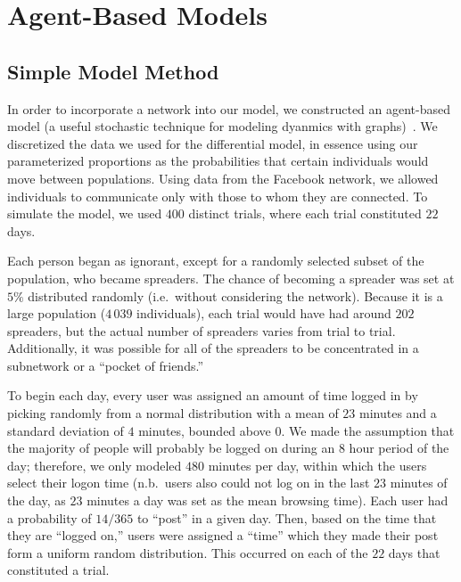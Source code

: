 \section{Agent-Based Models}
\label{sec:abmodel}

\subsection{Simple Model Method}
\label{subsec:abmodelsetup}

\noindent In order to incorporate a network into our model, we constructed an agent-based model (a useful stochastic technique for modeling dyanmics with graphs)~\cite{snijders-2010}.
We discretized the data we used for the differential model, in essence using our parameterized proportions as the probabilities that certain individuals would move between populations.
Using data from the Facebook network, we allowed individuals to communicate only with those to whom they are connected.
To simulate the model, we used $ 400 $ distinct trials, where each trial constituted $ 22 $ days.

Each person began as ignorant, except for a randomly selected subset of the population, who became spreaders.
The chance of becoming a spreader was set at $ 5\% $ distributed randomly (i.e.\ without considering the network).
Because it is a large population ($ 4\,039 $ individuals), each trial would have had around $ 202 $ spreaders, but the actual number of spreaders varies from trial to trial.
Additionally, it was possible for all of the spreaders to be concentrated in a subnetwork or a ``pocket of friends.''

To begin each day, every user was assigned an amount of time logged in by picking randomly from a normal distribution with a mean of $ 23 $ minutes and a standard deviation of $ 4 $ minutes, bounded above $ 0 $.
We made the assumption that the majority of people will probably be logged on during an $8$ hour period of the day; therefore, we only modeled $480$ minutes per day, within which the users select their logon time (n.b.\ users also could not log on in the last $ 23 $ minutes of the day, as $ 23 $ minutes a day was set as the mean browsing time).
Each user had a probability of $14/365$ to ``post'' in a given day.
Then, based on the time that they are ``logged on,'' users were assigned a ``time'' which they made their post form a uniform random distribution.
This occurred on each of the $ 22 $ days that constituted a trial.


